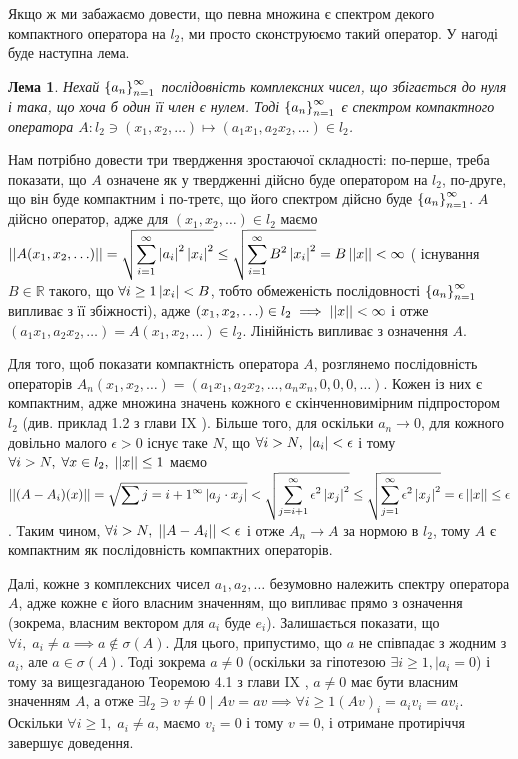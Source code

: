 \documentclass[12pt]{article} %
\newtheorem{myulem}[theorem]{Лема}
\renewenvironment{myproof}[1][Доведення]{\begin{trivlist}
\item[\hskip \labelsep {\bfseries #1}]}{\myqed\end{trivlist}}
\begin{document}
	Якщо ж ми забажаємо довести, що певна множина є спектром декого компактного оператора на $l_2$, ми просто сконструюємо такий оператор. У 
	нагоді буде наступна лема.
	\begin{myulem}Нехай $\left\{a_n\right\}_{n=1}^{\infty}$ послідовність комплексних чисел, що збігається до нуля і така, що хоча б один її член
		є нулем.
		Тоді $\left\{a_n\right\}_{n=1}^{\infty}$ є спектром компактного оператора
	$A:l_2\ni(x_1,x_2,\hdots)\mapsto(a_1x_1,a_2x_2,\hdots)\in l_2$.\end{myulem}
	\begin{myproof} Нам потрібно довести три твердження зростаючої складності: по-перше, треба показати, що $A$ означене як у твердженні
		дійсно буде оператором на $l_2$, 
		по-друге, що він буде компактним
		і по-третє, що його спектром дійсно буде $\left\{a_n\right\}_{n=1}^{\infty}$.
		$A$ дійсно оператор, адже для $(x_1,x_2,\hdots)\in l_2$ маємо $\mynorm{A(x_1,x_2,\hdots)}=\sqrt{\sum_{i=1}^{\infty}
		\myabs{a_i}^2\myabs{x_i}^2}\leq\sqrt{\sum_{i=1}^{\infty}B^2\myabs{x_i}^2}=B\mynorm{x}<\infty$ (
		існування $B\in\mathbb{R}$ такого, що $\forall i\geq 1 \left|x_i\right|<B$, тобто обмеженість послідовності
		$\left\{a_n\right\}_{n=1}^{\infty}$ випливає з її збіжності), адже $(x_1,x_2,\hdots)\in l_2\implies
		\left|\left|x\right|\right|<\infty$ і отже $(a_1x_1,a_2x_2,\hdots)=A(x_1,x_2,\hdots)\in l_2$. Лінійність випливає з означення $A$.
		
		Для того, щоб показати компактність оператора $A$, розглянемо послідовність операторів $A_n(x_1,x_2,\dots)=(a_1x_1,a_2x_2,\dots,
		a_nx_n,0,0,0,\dots)$. Кожен із них є компактним, адже множина значень кожного є скінченновимірним підпростором $l_2$ (див. приклад
		1.2 з глави IX \cite{tb}). Більше того, для оскільки $a_n\to0$, для кожного довільно малого $\epsilon>0$ існує таке $N$,
		що $\forall i>N,\;\left|a_i\right|<\epsilon$ і тому $\forall i>N,\;\forall x\in l_2,\;\left|\left|x\right|\right|\leq1$ маємо $\mynorm{(A-A_i)(x)}=
		\sqrt{\sum{j=i+1}^{\infty}\myabs{a_j\cdot x_j}}<\sqrt{\sum_{j=i+1}^{\infty}\epsilon^2\myabs{x_j}^2}\leq
		\sqrt{\sum_{j=1}^{\infty}\epsilon^2\myabs{x_j}^2}=\epsilon\mynorm{x}\leq\epsilon$. Таким чином, $\forall i>N,\;\left|\left|A-A_i\right|\right|<
		\epsilon$ і отже $A_n\to A$ за нормою в $l_2$, тому $A$ є компактним як послідовність компактних операторів.

		Далі, кожне з комплексних чисел $a_1,a_2,\hdots$ безумовно належить спектру оператора $A$, адже кожне є його власним значенням,
		що випливає прямо з означення (зокрема, власним вектором для $a_i$ буде $e_i$). Залишається показати, що $\forall i,\;a_i\neq a\implies a\notin\sigma(A)$.
		Для цього, припустимо, що $a$ не співпадає з жодним з $a_i$, але $a\in\sigma(A)$.
		Тоді зокрема $a\neq 0$ (оскільки за гіпотезою $\exists i\geq 1,\mid a_i=0$) і тому за вищезгаданою Теоремою 4.1 з
		глави IX \cite{tb}, $a\neq0$ має бути власним значенням $A$, а отже $\exists l_2\ni v\neq0\mid Av=av\implies\forall i\geq 1
		(Av)_i=a_iv_i=av_i$. Оскільки $\forall i\geq 1,\;a_i\neq a$, маємо $v_i=0$ і тому $v=0$, і отримане протиріччя завершує доведення.
	\end{myproof}
\end{document}
